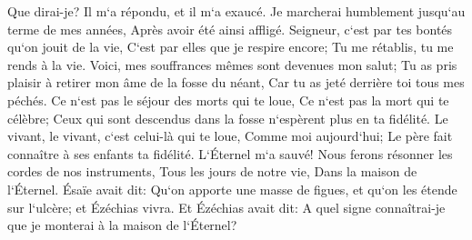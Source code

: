\verse Que dirai-je? Il m`a répondu, et il m`a exaucé. Je marcherai humblement jusqu`au terme de mes années, Après avoir été ainsi affligé. 
\verse Seigneur, c`est par tes bontés qu`on jouit de la vie, C`est par elles que je respire encore; Tu me rétablis, tu me rends à la vie. 
\verse Voici, mes souffrances mêmes sont devenues mon salut; Tu as pris plaisir à retirer mon âme de la fosse du néant, Car tu as jeté derrière toi tous mes péchés. 
\verse Ce n`est pas le séjour des morts qui te loue, Ce n`est pas la mort qui te célèbre; Ceux qui sont descendus dans la fosse n`espèrent plus en ta fidélité. 
\verse Le vivant, le vivant, c`est celui-là qui te loue, Comme moi aujourd`hui; Le père fait connaître à ses enfants ta fidélité. 
\verse L`Éternel m`a sauvé! Nous ferons résonner les cordes de nos instruments, Tous les jours de notre vie, Dans la maison de l`Éternel. 
\verse Ésaïe avait dit: Qu`on apporte une masse de figues, et qu`on les étende sur l`ulcère; et Ézéchias vivra. 
\verse Et Ézéchias avait dit: A quel signe connaîtrai-je que je monterai à la maison de l`Éternel? 

